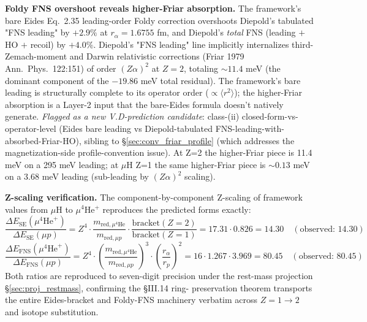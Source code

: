 \documentclass[11pt]{article}
\begin{document}
\textbf{Foldy FNS overshoot reveals higher-Friar absorption.}  The
framework's bare Eides Eq.~2.35 leading-order Foldy correction
overshoots Diepold's tabulated "FNS leading" by $+2.9\%$ at $r_\alpha = 1.6755$
fm, and Diepold's \emph{total} FNS (leading $+$ HO $+$ recoil) by
$+4.0\%$.  Diepold's "FNS leading" line implicitly internalizes
third-Zemach-moment and Darwin relativistic corrections (Friar 1979
Ann.\ Phys.\ 122:151) of order $(Z\alpha)^2$ at $Z=2$, totaling
$\sim 11.4$ meV (the dominant component of the $-19.86$ meV total
residual).  The framework's bare leading is structurally complete to
its operator order ($\propto \langle r^2 \rangle$); the higher-Friar
absorption is a Layer-2 input that the bare-Eides formula doesn't
natively generate.  \emph{Flagged as a new V.D-prediction candidate}:
class-(ii) closed-form-vs-operator-level (Eides bare leading vs
Diepold-tabulated FNS-leading-with-absorbed-Friar-HO), sibling to
\S\ref{sec:conv_friar_profile} (which addresses the magnetization-side
profile-convention issue).  At Z=2 the higher-Friar piece is 11.4 meV
on a 295 meV leading; at $\mu$H Z=1 the same higher-Friar piece is
$\sim 0.13$ meV on a 3.68 meV leading (sub-leading by $(Z\alpha)^2$
scaling).

\textbf{Z-scaling verification.}  The component-by-component Z-scaling
of framework values from $\mu$H to $\mu^4$He$^+$ reproduces the
predicted forms exactly:
\begin{equation}
\frac{\Delta E_\text{SE}(\mu^4\text{He}^+)}{\Delta E_\text{SE}(\mu p)}
= Z^4 \cdot \frac{m_{\text{red},\mu^4\text{He}}}{m_{\text{red},\mu p}}
  \cdot \frac{\text{bracket}(Z=2)}{\text{bracket}(Z=1)}
= 17.31 \cdot 0.826 = 14.30 \quad (\text{observed: } 14.30)
\end{equation}
\begin{equation}
\frac{\Delta E_\text{FNS}(\mu^4\text{He}^+)}{\Delta E_\text{FNS}(\mu p)}
= Z^4 \cdot \left(\frac{m_{\text{red},\mu^4\text{He}}}{m_{\text{red},\mu p}}\right)^3
  \cdot \left(\frac{r_\alpha}{r_p}\right)^2
= 16 \cdot 1.267 \cdot 3.969 = 80.45 \quad (\text{observed: } 80.45)
\end{equation}
Both ratios are reproduced to seven-digit precision under the rest-mass
projection \S\ref{sec:proj_restmass}, confirming the §III.14 ring-
preservation theorem transports the entire Eides-bracket and Foldy-FNS
machinery verbatim across $Z = 1 \to 2$ and isotope substitution.
\end{document}
